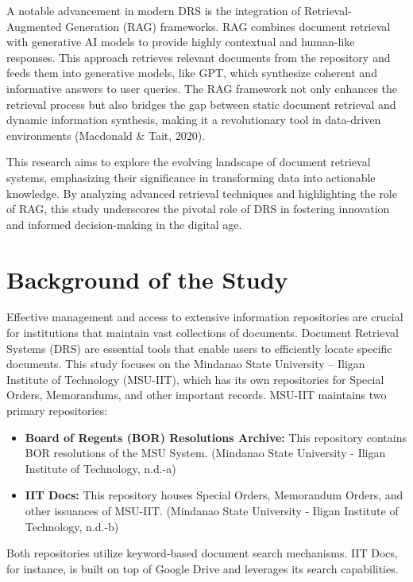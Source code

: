 A notable advancement in modern DRS is the integration of Retrieval-Augmented Generation (RAG) frameworks. RAG combines document retrieval with generative AI models to provide highly contextual and human-like responses. This approach retrieves relevant documents from the repository and feeds them into generative models, like GPT, which synthesize coherent and informative answers to user queries. The RAG framework not only enhances the retrieval process but also bridges the gap between static document retrieval and dynamic information synthesis, making it a revolutionary tool in data-driven environments (Macdonald \& Tait, 2020).

This research aims to explore the evolving landscape of document retrieval systems, emphasizing their significance in transforming data into actionable knowledge. By analyzing advanced retrieval techniques and highlighting the role of RAG, this study underscores the pivotal role of DRS in fostering innovation and informed decision-making in the digital age.

\section{Background of the Study}

Effective management and access to extensive information repositories are crucial for institutions that maintain vast collections of documents. Document Retrieval Systems (DRS) are essential tools that enable users to efficiently locate specific documents. This study focuses on the Mindanao State University – Iligan Institute of Technology (MSU-IIT), which has its own repositories for Special Orders, Memorandums, and other important records. MSU-IIT maintains two primary repositories:

\begin{itemize}
  \item \textbf{Board of Regents (BOR) Resolutions Archive:} This repository contains BOR resolutions of the MSU System. (Mindanao State University - Iligan Institute of Technology, n.d.-a)
  \item \textbf{IIT Docs:} This repository houses Special Orders, Memorandum Orders, and other issuances of MSU-IIT. (Mindanao State University - Iligan Institute of Technology, n.d.-b)
\end{itemize}

Both repositories utilize keyword-based document search mechanisms. IIT Docs, for instance, is built on top of Google Drive and leverages its search capabilities.

